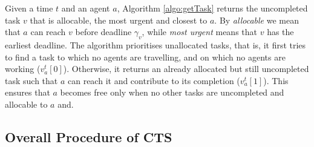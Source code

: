 Given a time $t$ and an agent $a$, Algorithm \ref{algo:getTask} returns the uncompleted
task $v$ that is allocable, the most urgent and closest to $a$. By \emph{allocable} we
mean that $a$ can reach $v$ before deadline $\gamma_v$, while \emph{most urgent} means
that $v$ has the earliest deadline. The algorithm prioritises unallocated tasks, that is,
it first tries to find a task to which no agents are travelling, and on which no agents
are working ($v_a^t[0]$). Otherwise, it returns an already allocated but still
uncompleted task such that $a$ can reach it and contribute to its completion ($v_a^t[1]$).
This ensures that $a$ becomes free only when no other tasks are uncompleted and allocable
to $a$ and.

\subsection{Overall Procedure of CTS}\label{sec:cts2}

